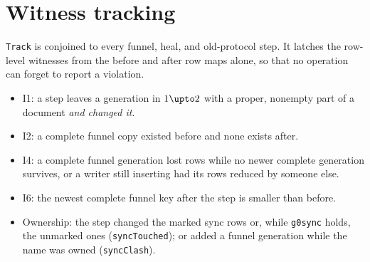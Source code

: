 \documentclass[a4paper,10pt,fleqn]{article}
\newcommand{\field}[1]{\texttt{#1}}
\begin{document}
\section{Witness tracking}
\label{sec:track}

\field{Track} is conjoined to every funnel, heal, and old-protocol step. It
latches the row-level witnesses from the before and after row maps alone, so
that no operation can forget to report a violation.

\begin{itemize}
  \item I1: a step leaves a generation in $1\upto2$ with a proper, nonempty
    part of a document \emph{and changed it}.
  \item I2: a complete funnel copy existed before and none exists after.
  \item I4: a complete funnel generation lost rows while no newer complete
    generation survives, or a writer still inserting had its rows reduced by
    someone else.
  \item I6: the newest complete funnel key after the step is smaller than
    before.
  \item Ownership: the step changed the marked sync rows or, while
    \field{g0sync} holds, the unmarked ones (\field{syncTouched}); or added a
    funnel generation while the name was owned (\field{syncClash}).
\end{itemize}
\end{document}
